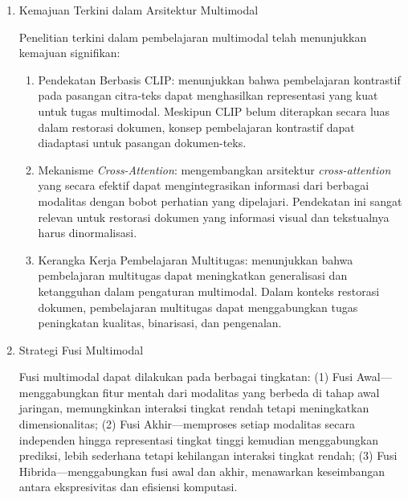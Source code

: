 \begin{enumerate}[leftmargin=*, labelindent=0pt, itemsep=1ex, topsep=0pt]

\item Kemajuan Terkini dalam Arsitektur Multimodal
\label{para:kemajuan-multimodal-arsitektur}

Penelitian terkini dalam pembelajaran multimodal telah menunjukkan kemajuan signifikan:

\begin{enumerate}[label=\alph*., leftmargin=1.5em, labelsep=0.5em, itemindent=0pt, noitemsep, topsep=0pt]
  \item Pendekatan Berbasis CLIP: \parencite{radford2021} menunjukkan bahwa pembelajaran kontrastif pada pasangan citra-teks dapat menghasilkan representasi yang kuat untuk tugas multimodal. Meskipun CLIP belum diterapkan secara luas dalam restorasi dokumen, konsep pembelajaran kontrastif dapat diadaptasi untuk pasangan dokumen-teks.

  \item Mekanisme \textit{Cross-Attention}: \parencite{vaswani2017} mengembangkan arsitektur \textit{cross-attention} yang secara efektif dapat mengintegrasikan informasi dari berbagai modalitas dengan bobot perhatian yang dipelajari. Pendekatan ini sangat relevan untuk restorasi dokumen yang informasi visual dan tekstualnya harus dinormalisasi.

  \item Kerangka Kerja Pembelajaran Multitugas: \parencite{raffel2020} menunjukkan bahwa pembelajaran multitugas dapat meningkatkan generalisasi dan ketangguhan dalam pengaturan multimodal. Dalam konteks restorasi dokumen, pembelajaran multitugas dapat menggabungkan tugas peningkatan kualitas, binarisasi, dan pengenalan.
\end{enumerate}

\item Strategi Fusi Multimodal
\label{para:strategi-fusi}

Fusi multimodal dapat dilakukan pada berbagai tingkatan: (1) Fusi Awal---menggabungkan fitur mentah dari modalitas yang berbeda di tahap awal jaringan, memungkinkan interaksi tingkat rendah tetapi meningkatkan dimensionalitas; (2) Fusi Akhir---memproses setiap modalitas secara independen hingga representasi tingkat tinggi kemudian menggabungkan prediksi, lebih sederhana tetapi kehilangan interaksi tingkat rendah; (3) Fusi Hibrida---menggabungkan fusi awal dan akhir, menawarkan keseimbangan antara ekspresivitas dan efisiensi komputasi.

\end{enumerate}

